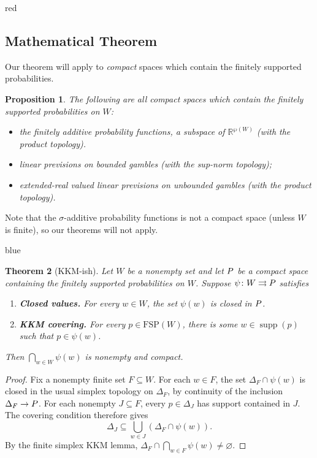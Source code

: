\documentclass[11pt]{article}
\newtheorem{theorem}{Theorem}[section]
\newtheorem{proposition}[theorem]{Proposition}
\theoremstyle{definition}
\theoremstyle{remark}
\newcommand{\R}{\mathbb R}
\newenvironment{AIwritten}{\begin{color}{blue}}{\end{color}}
\begin{document}
\begin{color}{red}
\subsection{Mathematical Theorem}
Our theorem will apply to \emph{compact} spaces which contain the finitely supported probabilities. 
\begin{proposition}
	The following are all compact spaces which contain the finitely supported probabilities on $W$:
	\begin{itemize}
		\item the finitely additive probability functions, a subspace of $\R^{\wp(W)}$ (with the product topology). 
		\item linear previsions on bounded gambles (with the sup-norm topology); 
		\item  extended-real valued linear previsions on unbounded gambles (with the product topology). 
	\end{itemize}
\end{proposition}

Note that the $\sigma$-additive probability functions is not a compact space (unless $W$ is finite), so our theorems will not apply. 
\begin{AIwritten}
	\begin{theorem}[KKM-ish]
		Let $W$ be a nonempty set and let $P$ be a compact space
		containing the finitely supported probabilities on $W$.
		Suppose $\psi\colon W\rightrightarrows P$ satisfies
		\begin{enumerate}
			\item \textbf{Closed values.}
			For every $w\in W$, the set $\psi(w)$ is closed in $P$.
			
			\item \textbf{KKM covering.}
			For every $p\in\mathrm{FSP}(W)$, there is some
			$w\in\operatorname{supp}(p)$ such that $p\in\psi(w)$.
		\end{enumerate}
		Then $\bigcap_{w\in W}\psi(w)$ is nonempty and compact.
	\end{theorem}
	
	\begin{proof}
		Fix a nonempty finite set $F\subseteq W$. For each $w\in F$,
		the set $\Delta_F\cap\psi(w)$ is closed in the usual simplex
		topology on $\Delta_F$, by continuity of the inclusion
		$\Delta_F\to P$. For each nonempty $J\subseteq F$, every
		$p\in\Delta_J$ has support contained in $J$. The covering
		condition therefore gives
		\[
		\Delta_J\subseteq\bigcup_{w\in J}(\Delta_F\cap\psi(w)).
		\]
		By the finite simplex KKM lemma,
		$\Delta_F\cap\bigcap_{w\in F}\psi(w)\neq\varnothing$.
		

\end{proof}
\end{AIwritten}
\end{color}
\end{document}

